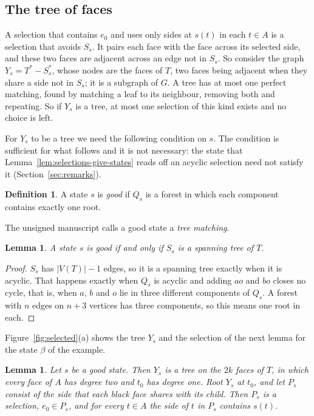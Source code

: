 \documentclass[10pt]{amsart}
\numberwithin{equation}{section}
\newtheorem{lemma}[equation]{Lemma}
\theoremstyle{definition}
\newtheorem{definition}[equation]{Definition}
\theoremstyle{remark}
\newcommand{\T}{T}
\begin{document}
\subsection*{The tree of faces}
A selection that contains $e_0$ and uses only sides at $s(t)$ in each $t\in A$ is a selection that avoids $S_s$.
It pairs each face with the face across its selected side, and these two faces are adjacent across an edge not in $S_s$.
So consider the graph $Y_s=\T^*-S_s^*$, whose nodes are the faces of $\T$, two faces being adjacent when they share a side not in $S_s$; it is a subgraph of $G$.
A tree has at most one perfect matching, found by matching a leaf to its neighbour, removing both and repeating.
So if $Y_s$ is a tree, at most one selection of this kind exists and no choice is left.

For $Y_s$ to be a tree we need the following condition on $s$.
The condition is sufficient for what follows and it is not necessary: the state that Lemma~\ref{lem:selections-give-states} reads off an acyclic selection need not satisfy it (Section~\ref{sec:remarks}).

\begin{definition}
A state $s$ is \emph{good} if $Q_s$ is a forest in which each component contains exactly one root.
\end{definition}

The unsigned manuscript \cite{Anonymous2026} calls a good state a \emph{tree matching}.

\begin{lemma}\label{lem:good}
A state $s$ is good if and only if $S_s$ is a spanning tree of $\T$.
\end{lemma}

\begin{proof}
$S_s$ has $|V(\T)|-1$ edges, so it is a spanning tree exactly when it is acyclic.
That happens exactly when $Q_s$ is acyclic and adding $ao$ and $bo$ closes no cycle, that is, when $a$, $b$ and $o$ lie in three different components of $Q_s$.
A forest with $n$ edges on $n+3$ vertices has three components, so this means one root in each.
\end{proof}

Figure~\ref{fig:selected}(a) shows the tree $Y_s$ and the selection of the next lemma for the state $\beta$ of the example.

\begin{lemma}\label{lem:Y}
Let $s$ be a good state.
Then $Y_s$ is a tree on the $2k$ faces of $\T$, in which every face of $A$ has degree two and $t_0$ has degree one.
Root $Y_s$ at $t_0$, and let $P_s$ consist of the side that each black face shares with its child.
Then $P_s$ is a selection, $e_0\in P_s$, and for every $t\in A$ the side of $t$ in $P_s$ contains $s(t)$.
\end{lemma}
\end{document}
